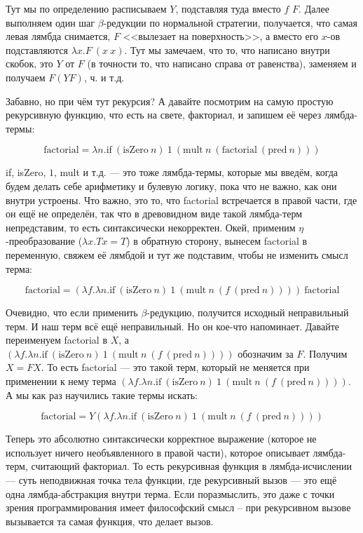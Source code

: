 \documentclass{../../text-style}
\begin{document}
Тут мы по определению расписываем $Y$, подставляя туда вместо $f$ $F$. Далее выполняем один шаг $\beta$-редукции по нормальной стратегии, получается, что самая левая лямбда снимается, $F$ <<вылезает на поверхность>>, а вместо его $x$-ов подставляются $\lambda x.F\ (x\ x)$. Тут мы замечаем, что то, что написано внутри скобок, это $Y$ от $F$ (в точности то, что написано справа от равенства), заменяем и получаем $F (Y F)$, ч. и т.д.

Забавно, но при чём тут рекурсия? А давайте посмотрим на самую простую рекурсивную функцию, что есть на свете, факториал, и запишем её через лямбда-термы:

$$\mbox{factorial} = \lambda n. \mbox{if}\ (\mbox{isZero}\ n)\ 1\ (\mbox{mult}\ n\ (\mbox{factorial}\ (\mbox{pred}\ n)))$$

if, isZero, $1$, mult и т.д. --- это тоже лямбда-термы, которые мы введём, когда будем делать себе арифметику и булевую логику, пока что не важно, как они внутри устроены. Что важно, это то, что factorial встречается в правой части, где он ещё не определён, так что в древовидном виде такой лямбда-терм непредставим, то есть синтаксически некорректен. Окей, применим $\eta$-преобразование ($\lambda x. T x = T$) в обратную сторону, вынесем factorial в переменную, свяжем её лямбдой и тут же подставим, чтобы не изменить смысл терма:

$$\mbox{factorial} = (\lambda f.\lambda n.\mbox{if}\ (\mbox{isZero}\ n)\ 1\ (\mbox{mult}\ n\ (f\ (\mbox{pred}\ n))))\ \mbox{factorial}$$

Очевидно, что если применить $\beta$-редукцию, получится исходный неправильный терм. И наш терм всё ещё неправильный. Но он кое-что напоминает. Давайте переименуем factorial в $X$, а $(\lambda f.\lambda n.\mbox{if}\ (\mbox{isZero}\ n)\ 1\ (\mbox{mult}\ n\ (f\ (\mbox{pred}\ n))))$ обозначим за $F$. Получим $X = F X$. То есть factorial --- это такой терм, который не меняется при применении к нему терма $(\lambda f.\lambda n.\mbox{if}\ (\mbox{isZero}\ n)\ 1\ (\mbox{mult}\ n\ (f\ (\mbox{pred}\ n))))$. А мы как раз научились такие термы искать:

$$\mbox{factorial} = Y (\lambda f.\lambda n.\mbox{if}\ (\mbox{isZero}\ n)\ 1\ (\mbox{mult}\ n\ (f\ (\mbox{pred}\ n))))$$

Теперь это абсолютно синтаксически корректное выражение (которое не использует ничего необъявленного в правой части), которое описывает лямбда-терм, считающий факториал. То есть рекурсивная функция в лямбда-исчислении --- суть неподвижная точка тела функции, где рекурсивный вызов --- это ещё одна лямбда-абстракция внутри терма. Если поразмыслить, это даже с точки зрения программирования имеет философский смысл -- при рекурсивном вызове вызывается та самая функция, что делает вызов.
\end{document}
